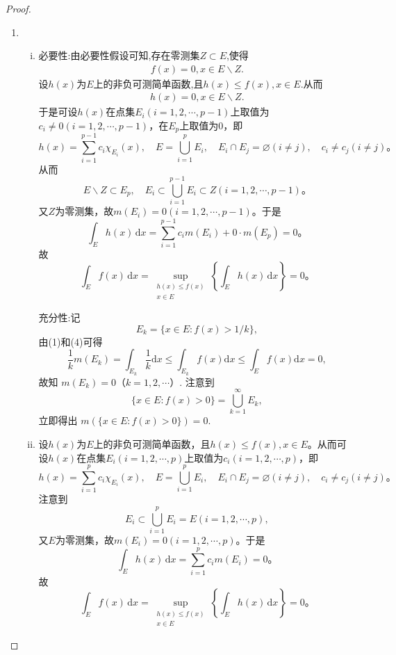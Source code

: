 \documentclass[../../main.tex]{subfiles}
\begin{document}
\begin{proof}
\begin{enumerate}[(1)]
\item \begin{enumerate}[(i)]
\item {\heiti 必要性:}由必要性假设可知,存在零测集$Z\subset E$,使得
\begin{align*}
f(x)=0,x\in E\backslash Z.
\end{align*}
设$h(x)$为$E$上的非负可测简单函数,且$h(x)\leqslant f(x),x\in E$.从而
\begin{align*}
h(x)=0,x\in E\backslash Z.
\end{align*}
于是可设$h(x)$在点集$E_i (i = 1,2,\cdots,p-1)$上取值为$c_i\ne 0 (i = 1,2,\cdots,p-1)$，在$E_p$上取值为$0$，即
\[
h(x) = \sum_{i=1}^{p-1} c_i \chi_{E_i}(x),\quad E = \bigcup_{i=1}^p E_i,\quad E_i \cap E_j = \varnothing (i \ne j),\quad c_i \ne c_j (i \ne j)。
\]
从而
\[
E\backslash Z \subset E_p,\quad E_i \subset \bigcup_{i=1}^{p-1} E_i \subset Z (i = 1,2,\cdots,p-1)。
\]
又$Z$为零测集，故$m(E_i) = 0 (i = 1,2,\cdots,p-1)$。于是
\[
\int_E h(x)\,\mathrm{d}x = \sum_{i=1}^{p-1} c_i m(E_i) + 0 \cdot m(E_p) = 0。
\]
故
\[
\int_E f(x)\,\mathrm{d}x = \sup_{\substack{h(x) \leqslant f(x) \\ x \in E}} \left\{ \int_E h(x)\,\mathrm{d}x \right\} = 0。
\]

{\heiti 充分性:}记
\[E_k=\{x\in E:f(x)>1/k\},\]
由(1)和(4)可得
\[\frac{1}{k}m(E_k)=\int_{E_k}\frac{1}{k}\mathrm{d}x\leqslant \int_{E_k}f(x)\mathrm{d}x\leqslant \int_{E}f(x)\mathrm{d}x = 0,\]
故知 \(m(E_k)=0\)（\(k = 1,2,\cdots\)）. 注意到
\[\{x\in E:f(x)>0\}=\bigcup_{k = 1}^{\infty}E_k,\]
立即得出 \(m(\{x\in E:f(x)>0\}) = 0\).

\item 设$h(x)$为$E$上的非负可测简单函数，且$h(x) \leqslant f(x), x\in E$。从而可设$h(x)$在点集$E_i (i = 1,2,\cdots,p)$上取值为$c_i (i = 1,2,\cdots,p)$，即
\[
h(x) = \sum_{i=1}^p c_i \chi_{E_i}(x),\quad E = \bigcup_{i=1}^p E_i,\quad E_i \cap E_j = \varnothing (i \ne j),\quad c_i \ne c_j (i \ne j)。
\]
注意到
\[
E_i \subset \bigcup_{i=1}^p E_i = E (i = 1,2,\cdots,p),
\]
又$E$为零测集，故$m(E_i) = 0 (i = 1,2,\cdots,p)$。于是
\[
\int_E h(x)\,\mathrm{d}x = \sum_{i=1}^p c_i m(E_i) = 0。
\]
故
\[
\int_E f(x)\,\mathrm{d}x = \sup_{\substack{h(x) \leqslant f(x) \\ x \in E}} \left\{ \int_E h(x)\,\mathrm{d}x \right\} = 0。
\]
\end{enumerate}
\end{enumerate} 

\end{proof}
\end{document}
